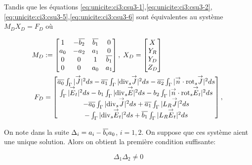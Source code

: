   Tandis que les équations \eqref{eq:unicite:ci3:csu3-1},\eqref{eq:unicite:ci3:csu3-2},\eqref{eq:unicite:ci3:csu3-5},\eqref{eq:unicite:ci3:csu3-6} sont équivalentes au système \(M_D X_D= F_D\) où

  \begin{align*}
    M_D&:=
    \begin{bmatrix}
      1&-{\overline{b_2}}&{\overline{b_1}}&0\\
      a_0&-a_2&a_1&0\\
      0&0&1&{\overline{b_1}}\\
      0&0&a_0&a_1\\
    \end{bmatrix},\;
    X_D =
    \begin{bmatrix}
      X\\
      Y_R\\
      Y_D\\
      Z_D
    \end{bmatrix}\\
    F_D &=
    \begin{bmatrix}
      {\overline{a_0}} \int_\Gamma |{\overset{\rightarrow}{J}}|^2ds - {\overline{a_1}} \int_\Gamma |{\operatorname{div}_s} {\overset{\rightarrow}{J}}|^2 ds - {\overline{a_2}} \int_\Gamma |{\overset{\rightarrow}{n}} \cdot {{\operatorname{rot}}_s} {\overset{\rightarrow}{J}}|^2 ds \\
      \int_\Gamma |{\overset{\rightarrow}{E}}_t|^2 ds  - b_1 \int_\Gamma | {\operatorname{div}_s} {\overset{\rightarrow}{E}} |^2 ds - b_2 \int_\Gamma | {\overset{\rightarrow}{n}} \cdot {{\operatorname{rot}}_s} {\overset{\rightarrow}{E}}_t|^2 ds \\
      -{\overline{a_0}} \int_\Gamma |{\operatorname{div}_s} {\overset{\rightarrow}{J}}|^2ds + {\overline{a_1}} \int_\Gamma | L_R {\overset{\rightarrow}{J}}|^2 ds \\
      -\int_\Gamma | {\operatorname{div}_s} {\overset{\rightarrow}{E}}_t |^2 ds  + {\overline{b_1}} \int_\Gamma | L_R {\overset{\rightarrow}{E}}_t|^2 ds
    \end{bmatrix},\;
  \end{align*}

  On note dans la suite \(\Delta_i = a_i-{\overline{b_i}}a_0\), \(i=1,2\). On suppose que ces système aient une unique solution. Alors on obtient la première condition suffisante:

  \begin{equation}
    \label{eq:unicite:ci3:csu3-cn-det}
    \Delta_1\Delta_2 \not = 0
  \end{equation}


